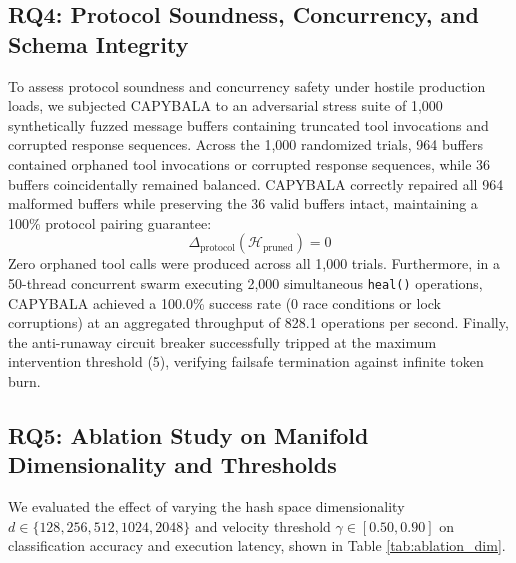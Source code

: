 \documentclass[journal]{IEEEtran}
\begin{document}
\subsection{RQ4: Protocol Soundness, Concurrency, and Schema Integrity}

To assess protocol soundness and concurrency safety under hostile production loads, we subjected CAPYBALA to an adversarial stress suite of 1,000 synthetically fuzzed message buffers containing truncated tool invocations and corrupted response sequences. Across the 1,000 randomized trials, 964 buffers contained orphaned tool invocations or corrupted response sequences, while 36 buffers coincidentally remained balanced. CAPYBALA correctly repaired all 964 malformed buffers while preserving the 36 valid buffers intact, maintaining a 100\% protocol pairing guarantee:
\begin{equation}
\Delta_{\text{protocol}}(\mathcal{H}_{\text{pruned}}) = 0
\end{equation}
Zero orphaned tool calls were produced across all 1,000 trials. Furthermore, in a 50-thread concurrent swarm executing 2,000 simultaneous \texttt{heal()} operations, CAPYBALA achieved a 100.0\% success rate (0 race conditions or lock corruptions) at an aggregated throughput of 828.1 operations per second. Finally, the anti-runaway circuit breaker successfully tripped at the maximum intervention threshold (5), verifying failsafe termination against infinite token burn.

\subsection{RQ5: Ablation Study on Manifold Dimensionality and Thresholds}
\label{sec:ablation}

We evaluated the effect of varying the hash space dimensionality $d \in \{128, 256, 512, 1024, 2048\}$ and velocity threshold $\gamma \in [0.50, 0.90]$ on classification accuracy and execution latency, shown in Table \ref{tab:ablation_dim}.

\begin{table}[!t]
\caption{Ablation of Manifold Dimension $d$ on SWE-bench Corpus}
\label{tab:ablation_dim}
\centering
{}
\end{table}
\end{document}
